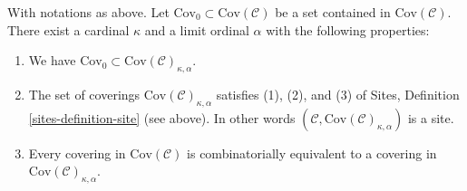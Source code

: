 \begin{lemma}
\label{lemma-coverings-site}
With notations as above.
Let $\text{Cov}_0 \subset \text{Cov}(\mathcal{C})$
be a set contained in $\text{Cov}(\mathcal{C})$.
There exist a cardinal $\kappa$ and a limit ordinal $\alpha$
with the following properties:
\begin{enumerate}
\item We have $\text{Cov}_0 \subset \text{Cov}(\mathcal{C})_{\kappa, \alpha}$.
\item The set of coverings
$\text{Cov}(\mathcal{C})_{\kappa, \alpha}$ satisfies
(1), (2), and (3) of Sites, Definition \ref{sites-definition-site} (see above).
In other words $(\mathcal{C}, \text{Cov}(\mathcal{C})_{\kappa, \alpha})$
is a site.
\item Every covering in $\text{Cov}(\mathcal{C})$
is combinatorially equivalent
to a covering in $\text{Cov}(\mathcal{C})_{\kappa, \alpha}$.
\end{enumerate}
\end{lemma}

